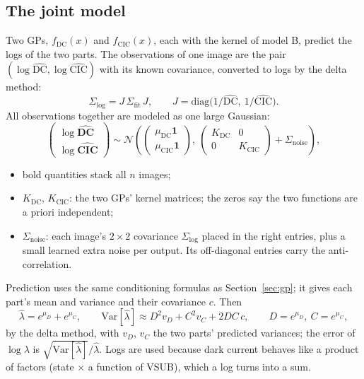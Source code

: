 \documentclass[11pt]{article}
\newcommand{\Var}{\mathrm{Var}}
\newcommand{\N}{\mathcal{N}}
\begin{document}
\subsection{The joint model}
Two GPs, $f_\text{DC}(x)$ and $f_\text{CIC}(x)$, each with the kernel of model B, predict the logs of the two parts. The
observations of one image are the pair $(\log\widehat{\text{DC}}, \log\widehat{\text{CIC}})$ with its known covariance, converted
to logs by the delta method:
\begin{equation}
\Sigma_\text{log} = J\,\Sigma_\text{fit}\,J,\qquad J = \mathrm{diag}\bigl(1/\widehat{\text{DC}},\ 1/\widehat{\text{CIC}}\bigr).
\end{equation}
All observations together are modeled as one large Gaussian:
\begin{equation}
\begin{pmatrix}\log\widehat{\textbf{DC}}\\ \log\widehat{\textbf{CIC}}\end{pmatrix} \sim
\N\!\left(\begin{pmatrix}\mu_\text{DC}\bm 1\\ \mu_\text{CIC}\bm 1\end{pmatrix},\
\begin{pmatrix}K_\text{DC} & 0\\ 0 & K_\text{CIC}\end{pmatrix} + \Sigma_\text{noise}\right),
\end{equation}
\begin{itemize}
\item bold quantities stack all $n$ images;
\item $K_\text{DC}$, $K_\text{CIC}$: the two GPs' kernel matrices; the zeros say the two functions are a priori independent;
\item $\Sigma_\text{noise}$: each image's $2\times2$ covariance $\Sigma_\text{log}$ placed in the right entries, plus a small learned
  extra noise per output. Its off-diagonal entries carry the anti-correlation.
\end{itemize}
Prediction uses the same conditioning formulas as Section~\ref{sec:gp}; it gives each part's mean and variance and their
covariance $c$. Then
\begin{equation}
\hat\lambda = e^{\mu_D} + e^{\mu_C},\qquad
\Var[\hat\lambda] \approx D^2 v_D + C^2 v_C + 2DC\,c,\qquad D = e^{\mu_D},\ C = e^{\mu_C},
\end{equation}
by the delta method, with $v_D$, $v_C$ the two parts' predicted variances; the error of $\log\lambda$ is $\sqrt{\Var[\hat\lambda]}/\hat\lambda$.
Logs are used because dark current behaves like a product of factors (state $\times$ a function of VSUB), which a log turns into a
sum.
\end{document}
